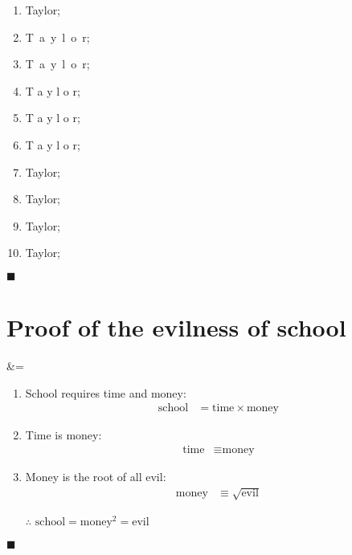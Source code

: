 \documentclass[12pt, titlepage,french]{article}
\begin{document}
\begin{distributions}[Proof]
\begin{enumerate}[label = \roman*.]
	\item	Taylor;
	\item	T\ a\ y\ l\ o\ r;
	\item	T\, a\, y\, l\, o\, r;
	\item	T\: a\: y\: l\: o\: r;
	\item	T\; a\; y\; l\; o\; r;
	\item	T\;\; a\;\; y\;\; l\;\; o\;\; r;
	\item	T\;\;\quad a\;\;\quad y\;\;\quad l\;\;\quad o\;\;\quad r;
	\item	T\;\;\quad\quad a\;\;\quad\quad y\;\;\quad\quad l\;\;\quad\quad o\;\;\quad\quad r;
	\item	T\;\;\quad\quad\quad a\;\;\quad\quad\quad y\;\;\quad\quad\quad l\;\;\quad\quad\quad o\;\;\quad\quad\quad r;
	\item	T\;\;\quad\quad\quad\quad a\;\;\quad\quad\quad\quad y\;\;\quad\quad\quad\quad l\;\;\quad\quad\quad\quad o\;\;\quad\quad\quad\quad r;
\end{enumerate}
\end{distributions}
$\blacksquare$

\clearpage

\section{Proof of the evilness of school}

\begin{theorems}[Theorem]
	&=	
\end{theorems}

\begin{distributions}[Proof]
\begin{enumerate}
	\item	School requires time and money:
		\begin{align*}
		\text{school}
		&=	\text{time}	\times \text{money}
		\end{align*}
	\item	Time is money:
		\begin{align*}
		\text{time}
		&\equiv	\text{money}
		\end{align*}
	\item	Money is the root of all evil:
		\begin{align*}
		\text{money}
		&\equiv	\sqrt{\text{evil}}
		\end{align*}
	\item[$\therefore$]	$\text{school}	=	\text{money}^{2}	=	\text{evil}$
\end{enumerate}
\end{distributions}
$\blacksquare$

\clearpage
\end{document}
